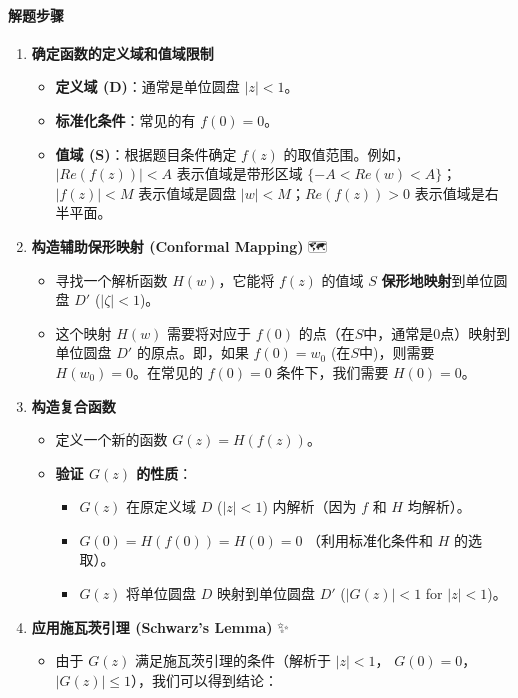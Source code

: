 \paragraph{解题步骤 📝}

\begin{enumerate}
	\item \textbf{确定函数的定义域和值域限制}
	\begin{itemize}
		\item \textbf{定义域 (D)}：通常是单位圆盘 $|z| < 1$。
		\item \textbf{标准化条件}：常见的有 $f(0) = 0$。
		\item \textbf{值域 (S)}：根据题目条件确定 $f(z)$ 的取值范围。例如，$|Re(f(z))| < A$ 表示值域是带形区域 $\{-A < Re(w) < A\}$；$|f(z)| < M$ 表示值域是圆盘 $|w| < M$；$Re(f(z)) > 0$ 表示值域是右半平面。
	\end{itemize}
	\item \textbf{构造辅助保形映射 (Conformal Mapping)} 🗺️
	\begin{itemize}
		\item 寻找一个解析函数 $H(w)$，它能将 $f(z)$ 的值域 $S$ \textbf{保形地映射}到单位圆盘 $D'$ ($|\zeta| < 1$)。
		\item 这个映射 $H(w)$ 需要将对应于 $f(0)$ 的点（在$S$中，通常是0点）映射到单位圆盘 $D'$ 的原点。即，如果 $f(0) = w_0$ (在$S$中)，则需要 $H(w_0) = 0$。在常见的 $f(0)=0$ 条件下，我们需要 $H(0)=0$。
	\end{itemize}
	\item \textbf{构造复合函数} 🧩
	\begin{itemize}
		\item 定义一个新的函数 $G(z) = H(f(z))$。
		\item \textbf{验证 $G(z)$ 的性质}：
		\begin{itemize}
			\item $G(z)$ 在原定义域 $D$ ($|z| < 1$) 内解析（因为 $f$ 和 $H$ 均解析）。
			\item $G(0) = H(f(0)) = H(0) = 0$ （利用标准化条件和 $H$ 的选取）。
			\item $G(z)$ 将单位圆盘 $D$ 映射到单位圆盘 $D'$ ($|G(z)| < 1$ for $|z| < 1$)。
		\end{itemize}
	\end{itemize}
	\item \textbf{应用施瓦茨引理 (Schwarz's Lemma)} ✨
	\begin{itemize}
		\item 由于 $G(z)$ 满足施瓦茨引理的条件（解析于 $|z|<1$， $G(0)=0$， $|G(z)| \le 1$），我们可以得到结论：

\end{itemize}
\end{enumerate}
